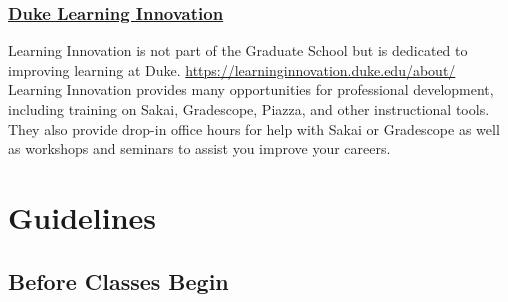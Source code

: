 \documentclass[
]{article}
\begin{document}
\hypertarget{duke-learning-innovation}{%
\subsubsection{\texorpdfstring{\href{https://learninginnovation.duke.edu}{Duke Learning Innovation}}{Duke Learning Innovation}}\label{duke-learning-innovation}}

Learning Innovation is not part of the Graduate School but is dedicated to improving learning at Duke. \url{https://learninginnovation.duke.edu/about/} Learning Innovation provides many opportunities for professional development, including training on Sakai, Gradescope, Piazza, and other instructional tools. They also provide drop-in office hours for help with Sakai or Gradescope as well as workshops and seminars to assist you improve your careers.

\hypertarget{guidelines}{%
\section{Guidelines}\label{guidelines}}

\hypertarget{before-classes-begin}{%
\subsection{Before Classes Begin}\label{before-classes-begin}}
\end{document}
